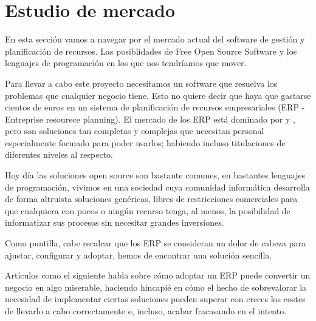 \section{Estudio de mercado}
En esta sección vamos a navegar por el mercado actual del software de gestión y planificación de recursos. Las posiblidades de Free Open Source Software y los lenguajes de programación en los que nos tendríamos que mover.
\vspace{1em}
\par Para llevar a cabo este proyecto necesitamos un software que resuelva los problemas que cualquier negocio tiene. Esto no quiere decir que haya que gastarse cientos de euros en un sistema de planificación de recursos empresariales (ERP - Entreprise resourece planning). El mercado de los ERP está dominado por \cite{oracleERP} y \cite{sapERP}, pero son soluciones tan completas y complejas que necesitan personal especialmente formado para poder usarlos; habiendo incluso titulaciones de diferentes niveles al respecto.
\vspace{1em}
\par Hoy día las soluciones open source son bastante comunes, en bastantes lenguajes de programación, vivimos en una sociedad cuya comunidad informática desarrolla de forma altruista soluciones genéricas, libres de restricciones comerciales para que cualquiera con pocos o ningún recurso tenga, al menos, la posibilidad de informatizar sus procesos sin necesitar grandes inversiones.
\vspace{1em}
\par Como puntilla, cabe recalcar que los ERP se consideran un dolor de cabeza para ajustar, configurar y adoptar, hemos de encontrar una solución sencilla.
\vspace{1em}
\par Artículos como el siguiente \citep{makingBusinessesMiserable} habla sobre cómo adoptar un ERP puede convertir un negocio en algo miserable, haciendo hincapié en cómo el hecho de sobrevalorar la necesidad de implementar ciertas soluciones pueden superar con creces los costes de llevarlo a cabo correctamente e, incluso, acabar fracasando en el intento.
\clearpage

